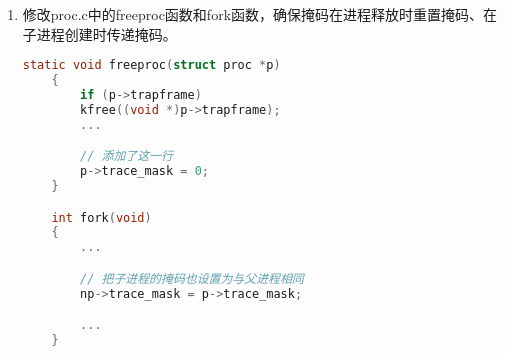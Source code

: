 \begin{enumerate}
\begin{lstlisting}[language=c, title=对syscall函数的修改]
            // 如果掩码对应，输出当前系统调用信息
            if ((trace_mask >> num) & 1)
            {
                printf("%d: syscall %s -> %d\n", 
                        p->pid, 
                        syscall_names[num - 1], 
                        p->trapframe->a0);
            }
        }
        else
        {
            ...
        }
    }
    \end{lstlisting}
    \item 修改proc.c中的freeproc函数和fork函数，确保掩码在进程释放时重置掩码、在子进程创建时传递掩码。
          \newpage
          \begin{lstlisting}[language=c, title=对proc.c的修改]
    static void freeproc(struct proc *p)
    {
        if (p->trapframe)
        kfree((void *)p->trapframe);
        ...

        // 添加了这一行
        p->trace_mask = 0;
    }

    int fork(void)
    {
        ...

        // 把子进程的掩码也设置为与父进程相同
        np->trace_mask = p->trace_mask;

        ...
    }
    \end{lstlisting}
\end{enumerate}